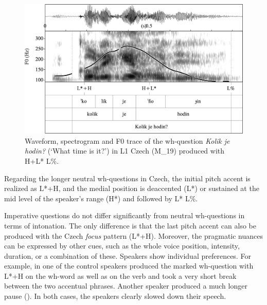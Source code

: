 \begin{figure}


\includegraphics[width=\textwidth]{figures/Figure_4.108.png}


\caption{Waveform, spectrogram and F0 trace of the wh-question \textit{Kolik je hodin?} (‘What time is it?’) in L1 Czech (M\_19) produced with H+L* L\%.}
\label{fig:4.108}
\end{figure}

Regarding the longer neutral wh-questions in Czech, the initial pitch accent is realized as L*+H, and the medial position is deaccented (L*) or sustained at the mid level of the speaker’s range (H*) and followed by L* L\%.\largerpage


Imperative questions do not differ significantly from neutral wh-questions in terms of intonation. The only difference is that the last pitch accent can also be produced with the Czech \textit{focus} pattern (L*+H). Moreover, the pragmatic nuances can be expressed by other cues, such as the whole voice position, intensity, duration, or a combination of these. Speakers show individual preferences. For example, in  one of the control speakers produced the marked wh-question with L*+H on the wh-word as well as on the verb and took a very short break between the two accentual phrases. Another speaker produced a much longer pause (). In both cases, the speakers clearly slowed down their speech.


